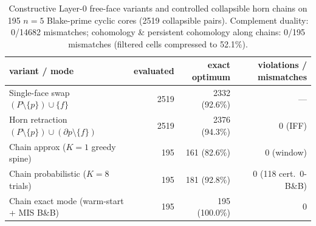 \begin{table}[h]\centering\small
\caption{Constructive Layer-0 free-face variants and controlled collapsible horn chains on 195 $n=5$ Blake-prime cyclic cores (2519 collapsible pairs). Complement duality: 0/14682 mismatches; cohomology \& persistent cohomology along chains: 0/195 mismatches (filtered cells compressed to 52.1\%).}
\label{tab:horn-chains}
\begin{tabular}{lrrr}\hline
variant / mode & evaluated & exact optimum & violations / mismatches \\\hline
Single-face swap $(P\setminus\{p\})\cup\{f\}$ & 2519 & 2332 (92.6\%) & — \\
Horn retraction $(P\setminus\{p\})\cup(\partial p\setminus\{f\})$ & 2519 & 2376 (94.3\%) & 0 (IFF) \\
Chain approx ($K=1$ greedy spine) & 195 & 161 (82.6\%) & 0 (window) \\
Chain probabilistic ($K=8$ trials) & 195 & 181 (92.8\%) & 0 (118 cert.\ 0-B\&B) \\
Chain exact mode (warm-start + MIS B\&B) & 195 & 195 (100.0\%) & 0 \\
\hline\end{tabular}\end{table}
